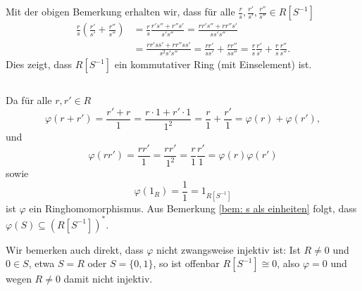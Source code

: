 \documentclass[a4paper,10pt]{article}
\theoremstyle{definition}
\begin{document}
Mit der obigen Bemerkung erhalten wir, dass für alle $\frac{r}{s}, \frac{r'}{s'}, \frac{r''}{s''} \in R[S^{-1}]$
\begin{align*}
 \frac{r}{s} \left( \frac{r'}{s'} + \frac{r''}{s''} \right)
 &= \frac{r}{s} \frac{r's'' + r''s'}{s's''}
 = \frac{rr's''+rr''s'}{ss's''} \\
 &= \frac{rr'ss'+rr''ss'}{s^2s's''}
 = \frac{rr'}{ss'} + \frac{rr''}{ss''}
 = \frac{r}{s} \frac{r'}{s'} + \frac{r}{s} \frac{r''}{s''}.
\end{align*}
Dies zeigt, dass $R[S^{-1}]$ ein kommutativer Ring (mit Einselement) ist.


\subsection{}
Da für alle $r,r' \in R$
\[
 \varphi(r+r')
 = \frac{r'+r}{1}
 = \frac{r \cdot 1 + r' \cdot 1}{1^2}
 = \frac{r}{1} + \frac{r'}{1}
 = \varphi(r) + \varphi(r'),
\]
und
\[
 \varphi(rr')
 = \frac{rr'}{1}
 = \frac{rr'}{1^2}
 = \frac{r}{1} \frac{r'}{1}
 = \varphi(r)\varphi(r')
\]
sowie
\[
 \varphi(1_R)
 = \frac{1}{1}
 = 1_{R[S^{-1}]}
\]
ist $\varphi$ ein Ringhomomorphismus. Aus Bemerkung \ref{bem: s als einheiten} folgt, dass $\varphi(S) \subseteq (R[S^{-1}])^*$.

Wir bemerken auch direkt, dass $\varphi$ nicht zwangsweise injektiv ist: Ist $R \neq 0$ und $0 \in S$, etwa $S = R$ oder $S = \{0,1\}$, so ist offenbar $R[S^{-1}] \cong 0$, also $\varphi = 0$ und wegen $R \neq 0$ damit nicht injektiv.
\end{document}
